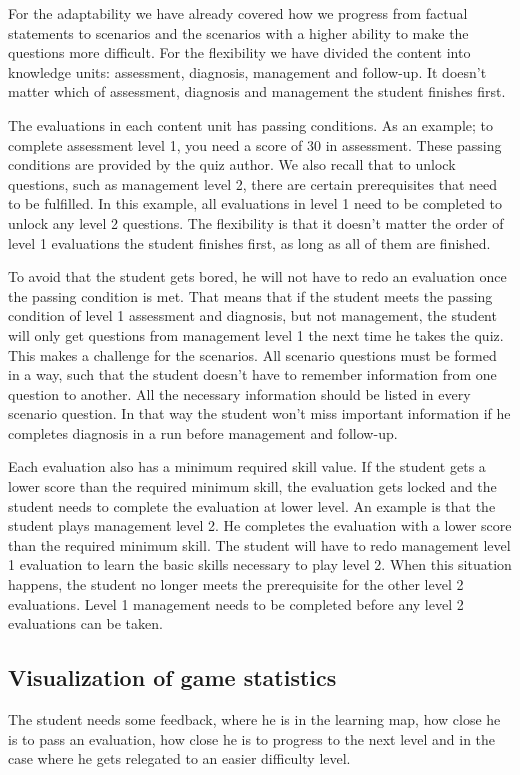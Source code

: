 For the adaptability we have already covered how we progress from factual statements to scenarios and the scenarios with a higher ability to make the questions more difficult. For the flexibility we have divided the content into knowledge units: assessment, diagnosis, management and follow-up. It doesn't matter which of assessment, diagnosis and management the student finishes first.

The evaluations in each content unit has passing conditions. As an example; to complete assessment level 1, you need a score of 30 in assessment. These passing conditions are provided by the quiz author. We also recall that to unlock questions, such as management level 2, there are certain prerequisites that need to be fulfilled. In this example, all evaluations in level 1 need to be completed to unlock any level 2 questions. The flexibility is that it doesn't matter the order of level 1 evaluations the student finishes first, as long as all of them are finished.

To avoid that the student gets bored, he will not have to redo an evaluation once the passing condition is met. That means that if the student meets the passing condition of level 1 assessment and diagnosis, but not management, the student will only get questions from management level 1 the next time he takes the quiz. This makes a challenge for the scenarios. All scenario questions must be formed in a way, such that the student doesn't have to remember information from one question to another. All the necessary information should be listed in every scenario question. In that way the student won't miss important information if he completes diagnosis in a run before management and follow-up. 

Each evaluation also has a minimum required skill value. If the student gets a lower score than the required minimum skill, the evaluation gets locked and the student needs to complete the evaluation at lower level. An example is that the student plays management level 2. He completes the evaluation with a lower score than the required minimum skill. The student will have to redo management level 1 evaluation to learn the basic skills necessary to play level 2. When this situation happens, the student no longer meets the prerequisite for the other level 2 evaluations. Level 1 management needs to be completed before any level 2 evaluations can be taken. 


\subsection{Visualization of game statistics}
The student needs some feedback, where he is in the learning map, how close he is to pass an evaluation, how close he is to progress to the next level and in the case where he gets relegated to an easier difficulty level.

